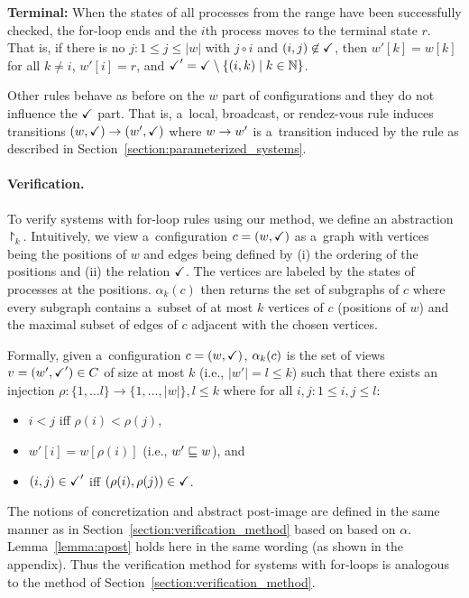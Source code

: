 \noindent\begin{minipage}[!t]{0.7\linewidth}%
  {\bf Terminal:} When the states of all processes from the range have
  been successfully checked, the for-loop ends and the $i$th process
  moves to the terminal state $r$.  That is, if there is no $j:1\leq j
  \leq |w|$ with $j\circ i$ and $(i,j)\not\in\checkmark$, then $w'[k]=w[k]$
  for all $k\neq i$, $w'[i] = r$, and $\checkmark' =
  \checkmark\setminus\{(i,k)\mid k\in \mathbb N\}$.
\end{minipage}
\hfill%
\begin{minipage}[!t]{0.29\linewidth}%
  
\end{minipage}

Other rules behave as before on the $w$ part of configurations and they do not influence the $\checkmark$ part.
That is, a~local, broadcast, or rendez-vous rule induces transitions $(w,\checkmark) \rightarrow (w',\checkmark)$ where 
$w\rightarrow w'$ is a~transition induced by the rule as described in Section~\ref{section:parameterized_systems}.  


\paragraph{Verification.}
To verify systems with for-loop rules using our method, we define an abstraction $\project_k$.
Intuitively, we view a~configuration $c = (w,\checkmark)$ as a~graph with vertices being the positions of $w$ and edges being defined by (i) the ordering of the positions and (ii) the relation $\checkmark$. The vertices are labeled by the states of processes at the positions. $\alpha_k(c)$ then returns the set of subgraphs of $c$ where every subgraph contains a~subset of at most $k$ vertices of $c$ (positions of $w$) and the maximal subset of edges of $c$ adjacent with the chosen vertices.

Formally, given a~configuration $c = (w,\checkmark)$, 
$\alpha_k(c)$ is the set of views $v = (w',\checkmark')\in C$ 
of size at most $k$ (i.e., $|w'| = l \leq k$) 
such that there exists an injection $\rho:\{1,\ldots l\}\rightarrow\{1,\ldots,|w|\},l\leq k$ where
for all $i,j:1\leq i,j \leq l$:
\begin{itemize}
\item
$i<j$ iff $\rho(i)<\rho(j)$,
\item
$w'[i]=w[\rho(i)]$ (i.e., $w'\sqsubseteq w$), and
\item
$(i,j)\in\checkmark'$ iff $(\rho(i),\rho(j))\in\checkmark$.
\end{itemize}
%
The notions of concretization and abstract post-image are defined in
the same manner as in Section~\ref{section:verification_method} based on
based on $\alpha$.
%
Lemma~\ref{lemma:apost} holds here in the same wording (as shown in
the appendix).
%
Thus the verification method for systems with for-loops is analogous
to the method of Section~\ref{section:verification_method}.



